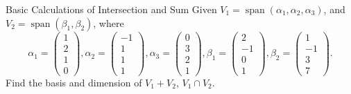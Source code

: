 \begin{example}{Basic Calculations of Intersection and Sum}{}
  Given $V_1 = \operatorname{span}(\alpha_1, \alpha_2, \alpha_3)$,
  and $V_2 = \operatorname{span}(\beta_1, \beta_2)$,
  where
  \begin{equation}
    \alpha_1=\begin{pmatrix}1\\2\\1\\0\end{pmatrix},\alpha_2=\begin{pmatrix}-1\\1\\1\\1\end{pmatrix},\alpha_3=\begin{pmatrix}0\\3\\2\\1\end{pmatrix},\beta_1=\begin{pmatrix}2\\-1\\0\\1\end{pmatrix},\beta_2=\begin{pmatrix}1\\-1\\3\\7\end{pmatrix}.
  \end{equation}
  Find the basis and dimension of $V_1 + V_2$, $V_1 \cap V_2$.
\end{example}

